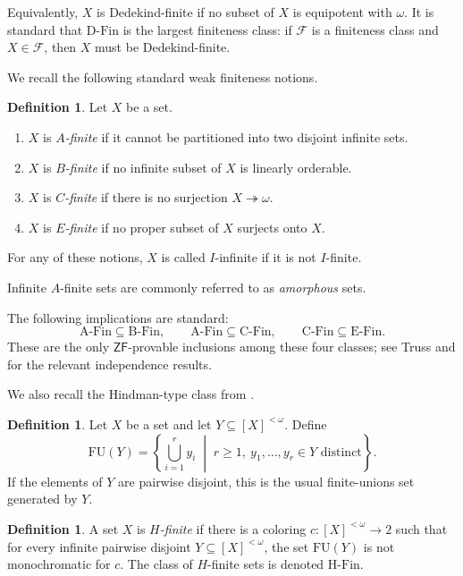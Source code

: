 \documentclass[11pt]{amsart}
\theoremstyle{definition}
\newtheorem{definition}[theorem]{Definition}
\newcommand{\ZF}{\mathsf{ZF}}
\newcommand{\DFin}{\mathrm{D\text{-}Fin}}
\newcommand{\BFin}{\mathrm{B\text{-}Fin}}
\newcommand{\CFin}{\mathrm{C\text{-}Fin}}
\newcommand{\EFin}{\mathrm{E\text{-}Fin}}
\newcommand{\AFin}{\mathrm{A\text{-}Fin}}
\newcommand{\HFin}{\mathrm{H\text{-}Fin}}
\newcommand{\FU}{\mathrm{FU}}
\begin{document}
Equivalently, \(X\) is Dedekind-finite if no subset of \(X\) is equipotent with \(\omega\).  It is standard that \(\DFin\) is the largest finiteness class: if \(\mathcal F\) is a finiteness class and \(X\in\mathcal F\), then \(X\) must be Dedekind-finite.

We recall the following standard weak finiteness notions.

\begin{definition}
Let \(X\) be a set.
\begin{enumerate}[label=(\arabic*)]
    \item \(X\) is \emph{\(A\)-finite} if it cannot be partitioned into two disjoint infinite sets.
    \item \(X\) is \emph{\(B\)-finite} if no infinite subset of \(X\) is linearly orderable.
    \item \(X\) is \emph{\(C\)-finite} if there is no surjection \(X\twoheadrightarrow \omega\).
    \item \(X\) is \emph{\(E\)-finite} if no proper subset of \(X\) surjects onto \(X\).
\end{enumerate}
For any of these notions, \(X\) is called \(I\)-infinite if it is not \(I\)-finite.
\end{definition}

Infinite \(A\)-finite sets are commonly referred to as \emph{amorphous} sets.

The following implications are standard:
\[
    \AFin\subseteq\BFin,
    \qquad
    \AFin\subseteq\CFin,
    \qquad
    \CFin\subseteq\EFin.
\]
These are the only \(\ZF\)-provable inclusions among these four classes; see Truss \cite{TrussFiniteness} and \cite{JechAC,Truss} for the relevant independence results.

We also recall the Hindman-type class from \cite{BCF}.

\begin{definition}
Let \(X\) be a set and let \(Y\subseteq [X]^{<\omega}\).  Define
\[
    \FU(Y)=\left\{\bigcup_{i=1}^r y_i \;\middle|\; r\geq 1,\ y_1,\dots,y_r\in Y\text{ distinct}\right\}.
\]
If the elements of \(Y\) are pairwise disjoint, this is the usual finite-unions set generated by \(Y\).
\end{definition}

\begin{definition}
A set \(X\) is \emph{\(H\)-finite} if there is a coloring \(c:[X]^{<\omega}\to 2\) such that for every infinite pairwise disjoint \(Y\subseteq [X]^{<\omega}\), the set \(\FU(Y)\) is not monochromatic for \(c\).  The class of \(H\)-finite sets is denoted \(\HFin\).
\end{definition}
\end{document}
